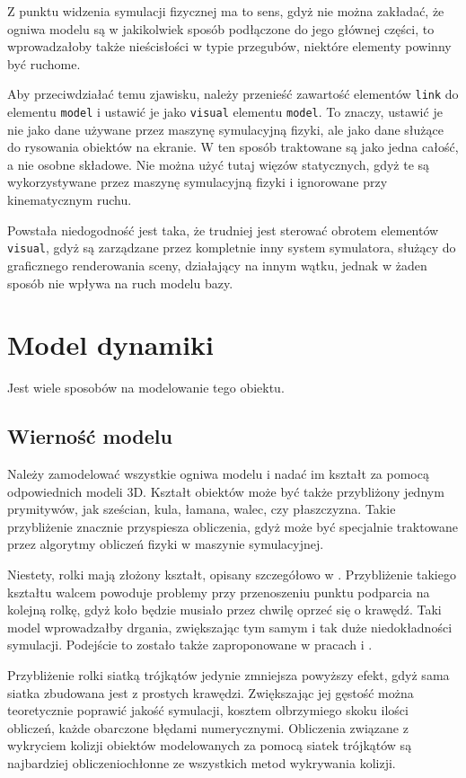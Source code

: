 		Z punktu widzenia symulacji fizycznej ma to sens, gdyż nie można zakładać, że ogniwa modelu są w jakikolwiek sposób podłączone do jego głównej części, 
		to wprowadzałoby także nieścisłości w typie przegubów, niektóre elementy powinny być ruchome.

		Aby przeciwdziałać temu zjawisku, należy przenieść zawartość elementów \texttt{link} do elementu \texttt{model} i ustawić je jako \texttt{visual} elementu \texttt{model}.
		To znaczy, ustawić je nie jako dane używane przez maszynę symulacyjną fizyki, ale jako dane służące do rysowania obiektów na ekranie.
		W ten sposób traktowane są jako jedna całość, a nie osobne składowe.
		Nie można użyć tutaj więzów statycznych, gdyż te są wykorzystywane przez maszynę symulacyjną fizyki i ignorowane przy kinematycznym ruchu.

		Powstała niedogodność jest taka, że trudniej jest sterować obrotem elementów \texttt{visual}, gdyż są zarządzane przez kompletnie inny system symulatora,
		służący do graficznego renderowania sceny, działający na innym wątku, jednak w żaden sposób nie wpływa na ruch modelu bazy.
		
\section{Model dynamiki}
	Jest wiele sposobów na modelowanie tego obiektu.
	\subsection{Wierność modelu}
		Należy zamodelować wszystkie ogniwa modelu i nadać im kształt za pomocą odpowiednich modeli 3D.
		Kształt obiektów może być także przybliżony jednym prymitywów, jak sześcian, kula, łamana, walec, czy płaszczyzna.
		Takie przybliżenie znacznie przyspiesza obliczenia, gdyż może być specjalnie traktowane przez algorytmy obliczeń fizyki
		w maszynie symulacyjnej.

		Niestety, rolki mają złożony kształt, opisany szczegółowo w \cite{rollers}.
		Przybliżenie takiego kształtu walcem powoduje problemy przy przenoszeniu punktu podparcia na kolejną rolkę, gdyż koło będzie musiało przez chwilę oprzeć się o krawędź.
		Taki model wprowadzałby drgania, zwiększając tym samym i tak duże niedokładności symulacji.
		Podejście to zostało także zaproponowane w pracach \cite{modelling_ways} i \cite{braking}.

		Przybliżenie rolki siatką trójkątów jedynie zmniejsza powyższy efekt, gdyż sama siatka zbudowana jest z prostych krawędzi.
		Zwiększając jej gęstość można teoretycznie poprawić jakość symulacji, kosztem olbrzymiego skoku ilości obliczeń, każde obarczone błędami numerycznymi.
		Obliczenia związane z wykryciem kolizji obiektów modelowanych za pomocą siatek trójkątów są najbardziej obliczeniochłonne ze wszystkich metod wykrywania kolizji. 

